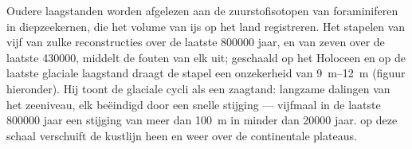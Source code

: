 Oudere laagstanden worden afgelezen aan de zuurstofisotopen van foraminiferen in diepzeekernen, die het volume van ijs op het land registreren. Het stapelen van vijf van zulke reconstructies over de laatste \num{800000} jaar, en van zeven over de laatste \num{430000}, middelt de fouten van elk uit; geschaald op het Holoceen en op de laatste glaciale laagstand draagt de stapel een onzekerheid van \qtyrange{9}{12}{m} (figuur hieronder). Hij toont de glaciale cycli als een zaagtand: langzame dalingen van het zeeniveau, elk beëindigd door een snelle stijging --- vijfmaal in de laatste \num{800000} jaar een stijging van meer dan \qty{100}{m} in minder dan \num{20000} jaar.  op deze schaal verschuift de kustlijn heen en weer over de continentale plateaus.

